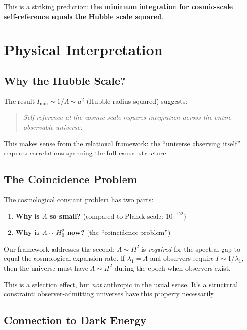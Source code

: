 \documentclass[11pt,a4paper]{article}
\theoremstyle{plain}
\theoremstyle{definition}
\theoremstyle{remark}
\begin{document}
This is a striking prediction: \textbf{the minimum integration for cosmic-scale self-reference equals the Hubble scale squared}.

\section{Physical Interpretation}

\subsection{Why the Hubble Scale?}

The result $I_{\min} \sim 1/\Lambda \sim a^2$ (Hubble radius squared) suggests:

\begin{quote}
\emph{Self-reference at the cosmic scale requires integration across the entire observable universe.}
\end{quote}

This makes sense from the relational framework: the ``universe observing itself'' requires correlations spanning the full causal structure.

\subsection{The Coincidence Problem}

The cosmological constant problem has two parts:
\begin{enumerate}[noitemsep]
    \item \textbf{Why is $\Lambda$ so small?} (compared to Planck scale: $10^{-122}$)
    \item \textbf{Why is $\Lambda \sim H_0^2$ now?} (the ``coincidence problem'')
\end{enumerate}

Our framework addresses the second: $\Lambda \sim H^2$ is \emph{required} for the spectral gap to equal the cosmological expansion rate. If $\lambda_1 = \Lambda$ and observers require $I \sim 1/\lambda_1$, then the universe must have $\Lambda \sim H^2$ during the epoch when observers exist.

This is a selection effect, but \emph{not} anthropic in the usual sense. It's a structural constraint: observer-admitting universes have this property necessarily.

\subsection{Connection to Dark Energy}
\end{document}

